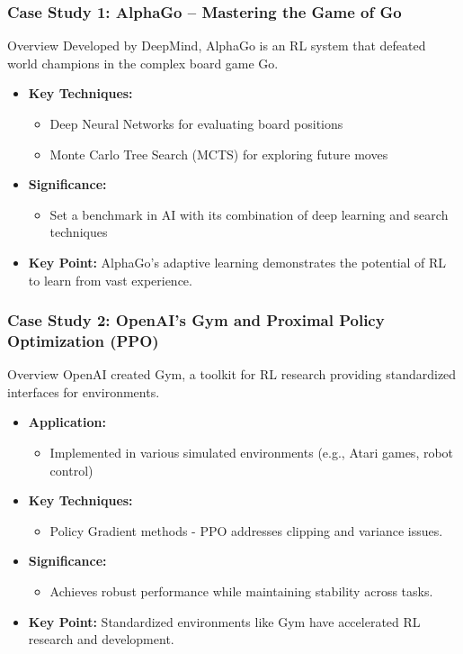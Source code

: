 \documentclass{beamer}
\begin{document}
\begin{frame}[fragile]
    \frametitle{Case Study 1: AlphaGo – Mastering the Game of Go}
    \begin{block}{Overview}
        Developed by DeepMind, AlphaGo is an RL system that defeated world champions in the complex board game Go.
    \end{block}
    \begin{itemize}
        \item \textbf{Key Techniques:}
            \begin{itemize}
                \item Deep Neural Networks for evaluating board positions
                \item Monte Carlo Tree Search (MCTS) for exploring future moves
            \end{itemize}
        \item \textbf{Significance:}
            \begin{itemize}
                \item Set a benchmark in AI with its combination of deep learning and search techniques
            \end{itemize}
        \item \textbf{Key Point:} AlphaGo's adaptive learning demonstrates the potential of RL to learn from vast experience.
    \end{itemize}
\end{frame}

\begin{frame}[fragile]
    \frametitle{Case Study 2: OpenAI's Gym and Proximal Policy Optimization (PPO)}
    \begin{block}{Overview}
        OpenAI created Gym, a toolkit for RL research providing standardized interfaces for environments.
    \end{block}
    \begin{itemize}
        \item \textbf{Application:} 
            \begin{itemize}
                \item Implemented in various simulated environments (e.g., Atari games, robot control)
            \end{itemize}
        \item \textbf{Key Techniques:}
            \begin{itemize}
                \item Policy Gradient methods - PPO addresses clipping and variance issues.
            \end{itemize}
        \item \textbf{Significance:}
            \begin{itemize}
                \item Achieves robust performance while maintaining stability across tasks.
            \end{itemize}
        \item \textbf{Key Point:} Standardized environments like Gym have accelerated RL research and development.
    \end{itemize}
\end{frame}
\end{document}
